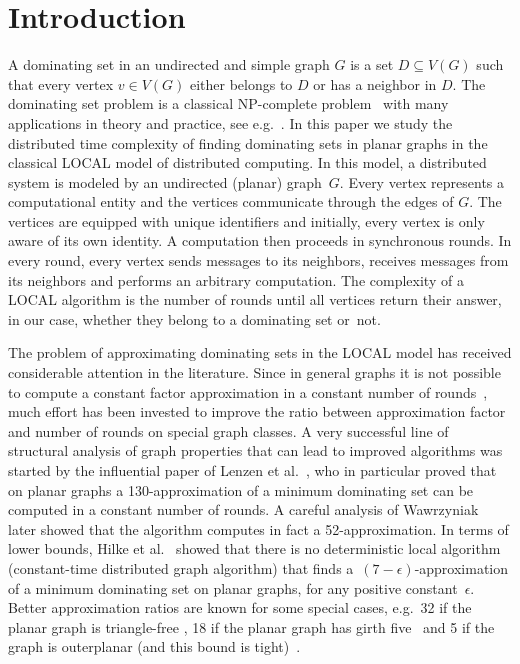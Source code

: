 
\section{Introduction}\label{sec:intro}

A dominating set in an undirected and simple graph $G$ is a set
$D\subseteq V(G)$ such that every vertex $v\in V(G)$ either belongs
to $D$ or has a neighbor in $D$. The dominating set problem is a
classical NP-complete problem~\cite{karp1972reducibility} with many
applications in theory and practice, see e.g.~\cite{du2012connected,sasireka2014applications}. In this paper we study
the distributed time complexity of finding
dominating sets in planar graphs in the classical LOCAL model of distributed computing.
In this model, a distributed system is modeled
by an undirected (planar) graph~$G$. Every vertex represents a
computational entity and the vertices communicate through the edges of
$G$. The vertices are equipped with unique identifiers and initially,
every vertex is only aware of its own identity. A computation then
proceeds in synchronous rounds.  In every round, every vertex sends
messages to its neighbors, receives messages from its neighbors and
performs an arbitrary computation.  The complexity of a LOCAL
algorithm is the number of rounds until all vertices return their
answer, in our case, whether they belong to a dominating set
or~not.


The problem of approximating
dominating sets in the LOCAL model has received considerable
attention in the literature. Since in general graphs
it is not possible to compute a
constant factor approximation in a constant number of rounds~\cite{KuhnMW16},
much effort has been invested to improve the ratio between approximation
factor and number of rounds on special graph classes. A very successful
line of structural analysis of graph properties that can lead to improved
algorithms was started by the influential paper of Lenzen et al.~\cite{lenzen2013distributed}, who in particular proved that on planar graphs
a 130-approximation
of a minimum dominating set can be computed in a constant number of
rounds. A careful analysis of Wawrzyniak~\cite{wawrzyniak2014strengthened}
later showed that the algorithm computes in fact a 52-approximation.
In terms of lower bounds, Hilke et al.~\cite{hilke2014brief} showed that there is no
deterministic local algorithm (constant-time distributed graph algorithm) that
finds a~$(7-\epsilon)$-approximation of a minimum dominating set on
planar graphs, for any positive constant~$\epsilon$. Better approximation
ratios are known for some special cases, e.g.\ 32 if the planar graph is
triangle-free \mbox{\cite[Theorem 2.1]{alipour2020distributed}}, 18 if the planar graph has girth
five~\cite{alipour2020local} and 5 if the graph is
outerplanar (and this bound is tight)~\cite[Theorem 1]{bonamy2021tight}.

